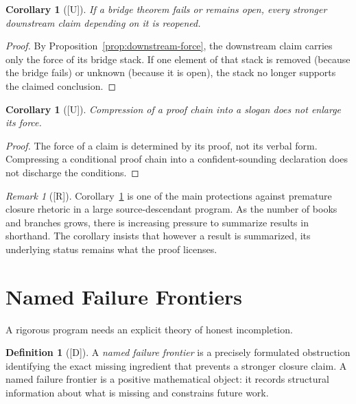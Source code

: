 \documentclass[12pt,oneside]{amsbook}
\theoremstyle{plain}
\newtheorem{corollary}[theorem]{Corollary}
\theoremstyle{definition}
\newtheorem{definition}[theorem]{Definition}
\theoremstyle{remark}
\newtheorem{remark}[theorem]{Remark}
\newcommand{\status}[1]{\textup{[#1]}}
\begin{document}
\begin{corollary}[\status{U}]\label{cor:failed-bridge-reopens}
If a bridge theorem fails or remains open, every stronger downstream
claim depending on it is reopened.
\end{corollary}

\begin{proof}
By Proposition~\ref{prop:downstream-force}, the downstream claim
carries only the force of its bridge stack.  If one element of that
stack is removed (because the bridge fails) or unknown (because it is
open), the stack no longer supports the claimed conclusion.
\end{proof}

\begin{corollary}[\status{U}]\label{cor:slogan-no-force}
Compression of a proof chain into a slogan does not enlarge its
force.
\end{corollary}

\begin{proof}
The force of a claim is determined by its proof, not its verbal form.
Compressing a conditional proof chain into a confident-sounding
declaration does not discharge the conditions.
\end{proof}

\begin{remark}[\status{R}]\label{rmk:slogan-protection}
Corollary~\ref{cor:slogan-no-force} is one of the main protections
against premature closure rhetoric in a large source-descendant
program.  As the number of books and branches grows, there is
increasing pressure to summarize results in shorthand.  The
corollary insists that however a result is summarized, its underlying
status remains what the proof licenses.
\end{remark}

\section{Named Failure Frontiers}
\label{sec:frontiers}

A rigorous program needs an explicit theory of honest incompletion.

\begin{definition}[\status{D}]\label{def:named-frontier}
A \emph{named failure frontier} is a precisely formulated obstruction
identifying the exact missing ingredient that prevents a stronger
closure claim.  A named failure frontier is a positive mathematical
object: it records structural information about what is missing and
constrains future work.
\end{definition}
\end{document}
